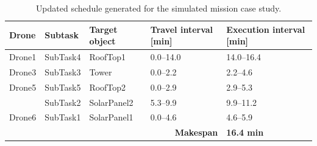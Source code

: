 \begin{table}[htbp]
\centering
\caption{Updated schedule generated for the simulated mission case study.}
\label{tab:second_schedule}
\begin{tabular}{lllll}
\toprule
Drone & Subtask & Target object & Travel interval [min] & Execution interval [min] \\
\midrule
Drone1 & SubTask4 & RoofTop1    & 0.0--14.0 & 14.0--16.4 \\
Drone3 & SubTask3 & Tower       & 0.0--2.2  & 2.2--4.6 \\
Drone5 & SubTask5 & RoofTop2    & 0.0--2.9  & 2.9--5.3 \\
       & SubTask2 & SolarPanel2 & 5.3--9.9  & 9.9--11.2 \\
Drone6 & SubTask1 & SolarPanel1 & 0.0--4.6  & 4.6--5.9 \\
\midrule
\multicolumn{4}{r}{\textbf{Makespan}} & \textbf{16.4 min} \\
\bottomrule
\end{tabular}
\end{table}